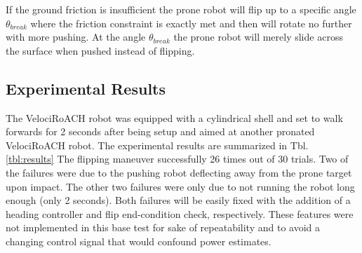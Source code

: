 \documentclass[letterpaper]{report}
\begin{document}
If the ground friction is insufficient the prone robot will flip up to a specific angle $\theta_{break}$ where the friction constraint is exactly met and then will rotate no further with more pushing.
At the angle $\theta_{break}$ the prone robot will merely slide across the surface when pushed instead of flipping.

\subsection{Experimental Results}
The VelociRoACH robot was equipped with a cylindrical shell and set to walk forwards for 2 seconds after being setup and aimed at another pronated VelociRoACH robot.
The experimental results are summarized in Tbl. \ref{tbl:results}
The flipping maneuver successfully 26 times out of 30 trials. Two of the failures were due to the pushing robot deflecting away from the prone target upon impact.
The other two failures were only due to not running the robot long enough (only 2 seconds).
Both failures will be easily fixed with the addition of a heading controller and flip end-condition check, respectively.
These features were not implemented in this base test for sake of repeatability and to avoid a changing control signal that would confound power estimates.
\end{document}
